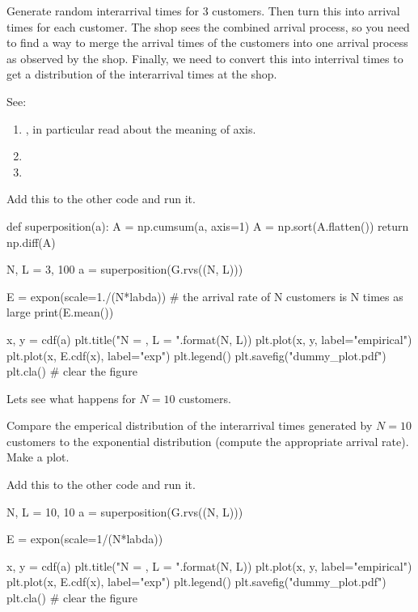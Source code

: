 \documentclass{scrartcl}
\begin{document}
\begin{exercise}
Generate random interarrival times for 3 customers. Then turn this into arrival times for each customer. The shop sees the combined arrival process, so you need to find a way to merge the arrival times of the customers into one arrival process as observed by the shop. Finally, we need to convert this into interrival times to get a distribution of the interarrival times at the shop. 

See:
\begin{enumerate}
\item {}, in particular read about the meaning of axis.
\item {}
\item {}
\end{enumerate}


\begin{solution}
Add this to the other code and run it. 
\begin{pyverbatim}
def superposition(a):
    A = np.cumsum(a, axis=1)
    A = np.sort(A.flatten())
    return np.diff(A)

N, L = 3, 100
a = superposition(G.rvs((N, L)))

E = expon(scale=1./(N*labda)) # the arrival rate of N customers is N times as large
print(E.mean())

x, y = cdf(a)
plt.title("N = {}, L = {}".format(N, L))
plt.plot(x, y,  label="empirical")
plt.plot(x, E.cdf(x),  label="exp")
plt.legend()
plt.savefig("dummy_plot.pdf")
plt.cla() # clear the figure
\end{pyverbatim}

\end{solution}
\end{exercise}

Lets see what happens for $N=10$ customers.

\begin{exercise}
  Compare  the emperical distribution of the interarrival times generated by  $N=10$ customers to the exponential distribution (compute the appropriate arrival rate). Make a plot. 
\begin{solution}
Add this to the other code and run it. 
\begin{pyverbatim}
N, L = 10, 10
a = superposition(G.rvs((N, L)))

E = expon(scale=1/(N*labda))

x, y = cdf(a)
plt.title("N = {}, L = {}".format(N, L))
plt.plot(x, y,  label="empirical")
plt.plot(x, E.cdf(x),  label="exp")
plt.legend()
plt.savefig("dummy_plot.pdf")
plt.cla() # clear the figure
\end{pyverbatim}

\end{solution}
\end{exercise}
\end{document}
